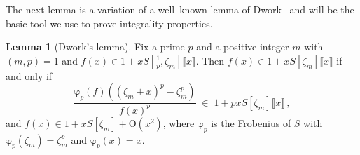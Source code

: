 \documentclass[12pt,reqno]{amsart}
\theoremstyle{definition}
\newtheorem{lemma}[proposition]{Lemma}
\def\Res#1{\underset{#1}{\mathrm{Res}}\,}
\def\be{\begin{equation}}
\def\ee{\end{equation}}
\def\z{\zeta}
\def\={\;=\;}
\def\inn{\;\in\;}
\def\fr{\mathrm{\varphi}_p}
\begin{document}
The next lemma is a variation of a well--known lemma of Dwork~
\cite[IV.Lem.3]{Koblitz} and will be the basic tool we use to prove integrality
properties.

\begin{lemma}[Dwork's lemma]
\label{lem:dwork}
Fix a prime $p$ and a positive integer $m$ with $(m,p)=1$ and  
$f(x)\in1+xS[\tfrac{1}{p},\z_{m}]\llbracket x\rrbracket$. Then
$f(x)\in1+x S[\z_{m}]\llbracket x\rrbracket$ if and only if
\be
\frac{\fr(f)((\z_{m}+x)^{p}-\z_{m}^p)}{f(x)^p}
\inn 1+px S[\z_{m}]\llbracket x\rrbracket\,,
\ee
and $f(x)\in1+x S[\z_{m}]+\mathrm{O}(x^2)$, where $\fr$ is the Frobenius of $S$
with $\fr(\z_{m})=\z_{m}^p$ and $\fr (x)=x$. 
\end{lemma}
\end{document}
